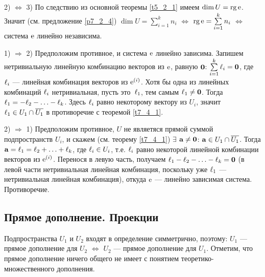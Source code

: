 2) $\Leftrightarrow$ 3)
По  следствию из основной теоремы \ref{t5_2_1} имеем $\mathop{\rm dim}\nolimits U=\mathop{\rm rg}\nolimits \mathrm{e}$.
Значит (см. предложение \ref{p7_2_4}) $\dim U = \sum \limits_{i=1}^{k} n_i$ 
$\Leftrightarrow$  $\mathop{\rm rg}\nolimits \mathrm{e} = \sum \limits_{i=1}^{k} n_i$
$\Leftrightarrow$  система $\mathrm{e}$ линейно независима.

1) $\Rightarrow$ 2) 
Предположим противное, и система $\mathrm{e}$ линейно зависима.
Запишем нетривиальную линейную  комбинацию векторов  из $\mathrm{e}$, равную $\mathbf{0}$:
$\sum \limits_{i=1}^{k}  \mathbf{\ell}_i=\mathbf{0}$, где $\mathbf{\ell}_i$ --- линейная комбинация векторов из $\mathrm{e}^{(i)}$.
Хотя бы одна из линейных комбинаций $\mathbf{\ell}_i$  нетривиальная, пусть это~$\mathbf{\ell}_1$, тем самым $\mathbf{\ell}_1\neq \mathbf{0}$.
Тогда  $\mathbf{\ell}_1= - \mathbf{\ell}_2-\ldots - \mathbf{\ell}_k$. Здесь $\mathbf{\ell}_i$ равно некоторому вектору из $U_i$, 
значит $\mathbf{\ell}_1\in U_1\cap \overline{U_1}$  в противоречие с
теоремой \ref{t7_4_1}.

2) $\Rightarrow$ 1) 
Предположим противное, $U$ не являетяся прямой суммой подпространств $U_i$, и скажем 
(см. теорему \ref{t7_4_1}) $\exists$ $\mathbf{a}\neq \mathbf{0}$: $\mathbf{a}\in U_1\cap \overline{U_1}$.
Тогда $\mathbf{a}= \mathbf{\ell}_1= \mathbf{\ell}_2+\ldots +\mathbf{\ell}_k$, где $\mathbf{\ell}_i\in U_i$, т.е. $\mathbf{\ell}_i$ равно некоторой линейной комбинации векторов из $\mathrm{e}^{(i)}$.
Перенося в левую часть, получаем $\mathbf{\ell}_1- \mathbf{\ell}_2-\ldots -\mathbf{\ell}_k = \mathbf{0}$ (в левой части нетривиальная линейная комбинация, поскольку 
уже $\mathbf{\ell}_1$ --- нетривиальная линейная комбинация), откуда
$\mathrm{e}$ --- линейно зависимая система. Противоречие. 
\edok

\subsection{Прямое дополнение. Проекции}



Подпространства $U_1$ и $U_2$ входят в определение симметрично, поэтому: $U_1$ --- прямое дополнение для $U_2$ 
$\Leftrightarrow$ $U_2$ --- прямое дополнение для $U_1$.  
Отметим, что прямое дополнение ничего общего не имеет с понятием теоретико-множественного дополнения.


